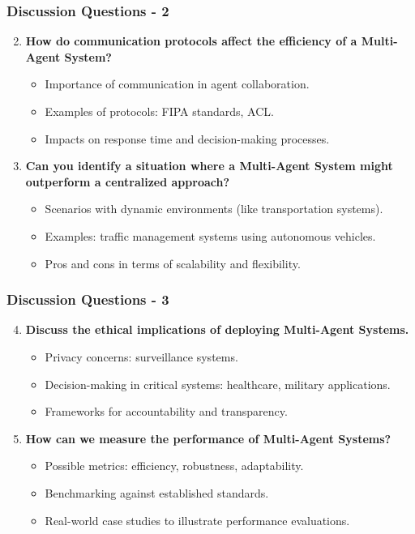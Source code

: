 \documentclass[aspectratio=169]{beamer}
\begin{document}
\begin{frame}[fragile]
    \frametitle{Discussion Questions - 2}
    \begin{enumerate}
        \setcounter{enumi}{1}
        \item \textbf{How do communication protocols affect the efficiency of a Multi-Agent System?}
            \begin{itemize}
                \item Importance of communication in agent collaboration.
                \item Examples of protocols: FIPA standards, ACL.
                \item Impacts on response time and decision-making processes.
            \end{itemize}
        \item \textbf{Can you identify a situation where a Multi-Agent System might outperform a centralized approach?}
            \begin{itemize}
                \item Scenarios with dynamic environments (like transportation systems).
                \item Examples: traffic management systems using autonomous vehicles.
                \item Pros and cons in terms of scalability and flexibility.
            \end{itemize}
    \end{enumerate}
\end{frame}

\begin{frame}[fragile]
    \frametitle{Discussion Questions - 3}
    \begin{enumerate}
        \setcounter{enumi}{3}
        \item \textbf{Discuss the ethical implications of deploying Multi-Agent Systems.}
            \begin{itemize}
                \item Privacy concerns: surveillance systems.
                \item Decision-making in critical systems: healthcare, military applications.
                \item Frameworks for accountability and transparency.
            \end{itemize}
        \item \textbf{How can we measure the performance of Multi-Agent Systems?}
            \begin{itemize}
                \item Possible metrics: efficiency, robustness, adaptability.
                \item Benchmarking against established standards.
                \item Real-world case studies to illustrate performance evaluations.
            \end{itemize}
    \end{enumerate}
\end{frame}
\end{document}

